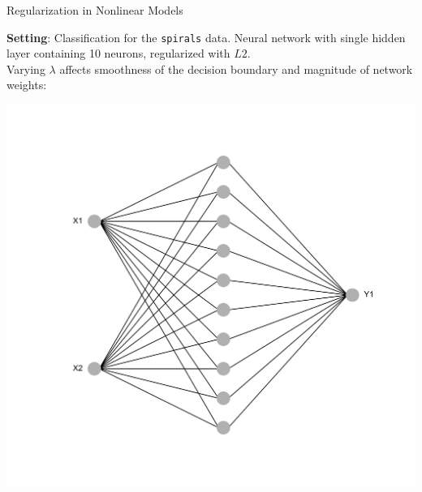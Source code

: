 \documentclass[11pt,compress,t,notes=noshow, xcolor=table]{beamer}
\begin{document}
\begin{frame}{Regularization in Nonlinear Models}

\begin{center}
\begin{minipage}{0.7\textwidth}
{\small
\textbf{Setting}: Classification for the \texttt{spirals} data.
Neural network with single hidden layer containing 10 neurons, regularized with $L2$. \\
Varying $\lambda$ affects smoothness of the decision boundary and magnitude of network weights:}
\end{minipage}%
\begin{minipage}{0.3\textwidth}
\includegraphics[width=1\textwidth]{figure/nn_size_10.png}
\end{minipage}
\end{center}




\vfill


\end{frame}
\end{document}
